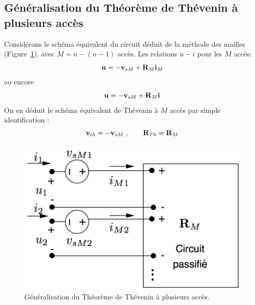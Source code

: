 \subsection{Généralisation du Théorème de Thévenin à plusieurs accès}
Considérons le schéma équivalent du circuit déduit de la méthode des mailles (Figure~\ref{fig:theveninMM}), avec $M=n-(n-1)$ accès.
Les relations $u-i$ pour les $M$ accès:
\[{\bf u}=-{\bf v}_{sM}+{\bf R}_M{\bf i}_M\]
ou encore
\[{\bf u}=-{\bf v}_{sM}+{\bf R}_M{\bf i}\]
On en déduit le schéma équivalent de Thévenin à $M$ accès par simple identification :
\[ {\bf v}_{th} = - {\bf v}_{sM}\,\, , \quad \quad {\bf R}_{Th}={\bf R}_{M}\]
\begin{figure}[htb]
	\centering
	\includegraphics[width=0.7\linewidth]{figs/methodes-generales/thevenin}
	\caption{Généralisation du Théorème de Thévenin à plusieurs accès.}
	\label{fig:theveninMM}
\end{figure}

